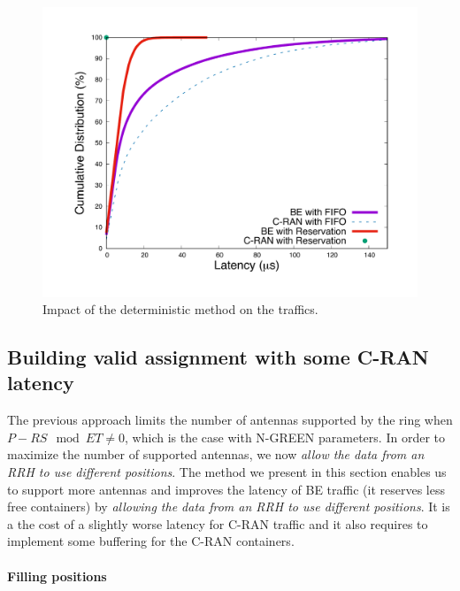 \documentclass[10pt, conference, letterpaper]{IEEEtran}
\begin{document}
  
  
  \begin{figure}[h!]
\begin{center}   

     \includegraphics[scale=0.25]{optim.pdf}
     \caption{Impact of the deterministic method on the traffics.}   \label{fig:optimres}

\end{center}
  \end{figure}
  
\subsection{Building valid assignment with some C-RAN latency}
\label{sec:maxant}

The previous approach limits the number of antennas supported by the ring when $P-RS \mod ET \neq 0$, which is the case with N-GREEN parameters. In order to maximize the number of supported antennas, we now \emph{allow the data from an RRH to use different positions}. The method we present in this section enables us to support more antennas and improves the latency of BE traffic (it reserves less free containers) by \emph{allowing the data from an RRH to use different positions}.
It is a the cost of a slightly worse latency for C-RAN traffic and it also requires to implement some buffering for the C-RAN containers. 



\paragraph{Filling positions}
\end{document}
